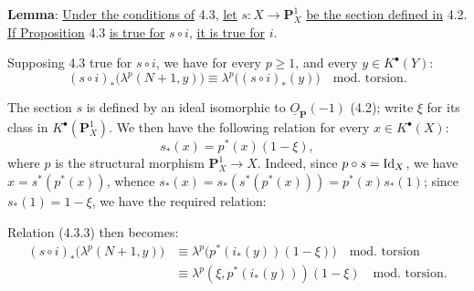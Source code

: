 \textbf{Lemma}: \uline{Under the conditions of} 4.3, \uline{let} \(s:X\to\mathbf P_X^1\) \uline{be the section defined in} 4.2. \uline{If Proposition} 4.3 \uline{is true for} \(s\circ i\), \uline{it is true for} \(i\).

Supposing 4.3 true for \(s\circ i\), we have for every \(p\ge1\), and every \(y\in K^{\bullet}(Y)\):
\begin{equation}\tag{4.3.3}
 (s\circ i)_*\bigl(\lambda^p(N+1,y)\bigr)
 \equiv
 \lambda^p\bigl((s\circ i)_*(y)\bigr)
 \quad\text{mod.\ torsion}.
\end{equation}

The section \(s\) is defined by an ideal isomorphic to \(\underline{O}_{\mathbf P}(-1)\) (4.2); write \(\xi\) for its class in \(K^{\bullet}(\mathbf P_X^1)\). We then have the following relation for every \(x\in K^{\bullet}(X)\):
\[
  s_*(x)=p^*(x)(1-\xi),
\]
where \(p\) is the structural morphism \(\mathbf P_X^1\to X\). Indeed, since \(p\circ s=\operatorname{Id}_X\), we have \(x=s^*(p^*(x))\), whence \(s_*(x)=s_*(s^*(p^*(x)))=p^*(x)s_*(1)\); since \(s_*(1)=1-\xi\), we have the required relation:

Relation (4.3.3) then becomes:
\[
\begin{aligned}
(s\circ i)_*\bigl(\lambda^p(N+1,y)\bigr)
&\equiv \lambda^p\bigl(p^*(i_*(y))(1-\xi)\bigr)\quad\text{mod.\ torsion}\\
&\equiv \lambda^p(\xi,p^*(i_*(y)))(1-\xi)\quad\text{mod.\ torsion}.
\end{aligned}
\]
